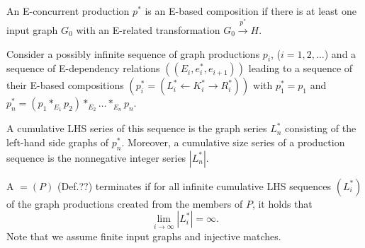 \begin{definition}[E-graph]
\end{definition}

\begin{definition}
\end{definition}

\begin{definition}[production]
\end{definition}

\begin{definition}
    An E-concurrent production $p^*$ is an E-based composition if there is at least one input graph $G_0$ with an E-related transformation $G_0 \xrightarrow{p^*} H$.
\end{definition}

\begin{definition}
    Consider a possibly infinite sequence of graph productions $p_i$, ($i = 1, 2, \ldots$) and a sequence of E-dependency relations $((E_i, e_i^*, e_{i+1}))$ leading to a sequence of their E-based compositions $(p_i^* = (L_i^* \leftarrow K_i^* \rightarrow R_i^*))$ with $p_1^* = p_1$ and $p_n^* = (p_1 *_{E_1} p_2) *_{E_2} \ldots *_{E_n} p_n$.
    
    A cumulative LHS series of this sequence is the graph series $L_n^*$ consisting of the left-hand side graphs of $p_n^*$. Moreover, a cumulative size series of a production sequence is the nonnegative integer series $|L_n^*|$.
    \end{definition}

\begin{theorem}
    A  $= (P)$ (Def.??) terminates if for all infinite cumulative LHS sequences $(L_i^*)$ of the graph productions created from the members of $P$, it holds that
    \[
    \lim_{i \to \infty} |L_i^*| = \infty.
    \]
    Note that we assume finite input graphs and injective matches.
\end{theorem}